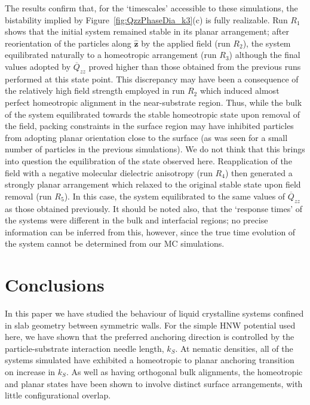 \documentclass[aps,10pt,twocolumn]{revtex4}
\newcommand{\vecth}[1]{ \mathbf{\hat{#1} } }
\begin{document}
The results confirm that, for the `timescales' accessible to these simulations, the bistability implied by
Figure~\ref{fig:QzzPhaseDia_k3}(c) is fully realizable. Run $R_1$ shows that the initial system remained stable in
its planar arrangement; after reorientation of the particles along $\vecth{z}$ by the applied field (run $R_2$),
the  system equilibrated naturally to a homeotropic arrangement (run $R_3$) although the final values adopted by
$\overline{Q}_{zz}$ proved higher than those obtained from the previous runs performed at this state point. This
discrepancy may have been a consequence of the relatively high field strength employed in run $R_2$ which induced
almost perfect homeotropic alignment in the near-substrate region. Thus, while the bulk of the system equilibrated
towards the stable homeotropic state upon removal of the field, packing constraints in the surface region may have
inhibited particles from adopting planar orientation close to the surface (as was seen for a small number of
particles in the previous simulations). We do not think that this brings into question the equilibration of the
state observed here. Reapplication of the field with a negative molecular dielectric anisotropy (run $R_4$) then
generated a strongly planar arrangement which relaxed to the original stable state upon field removal (run $R_5$).
In this case, the system equilibrated to the same values of $\overline{Q}_{zz}$ as those obtained previously. It
should be noted also, that the `response times' of the systems were different in the bulk and interfacial regions;
no precise information can be inferred from this, however, since the true time evolution of the system cannot be
determined from our MC simulations.

\section{Conclusions}
\label{s:ccl}

In this paper we have studied the behaviour of liquid crystalline systems confined in slab geometry between
symmetric walls. For the simple HNW potential used here, we have shown that the preferred anchoring direction is
controlled by the particle-substrate interaction needle length, $k_S$. At nematic densities, all of the systems
simulated have exhibited a homeotropic to planar anchoring transition on increase in $k_S$. As well as having
orthogonal bulk alignments, the homeotropic and planar states have been shown to involve distinct surface
arrangements, with little configurational overlap.
\end{document}
